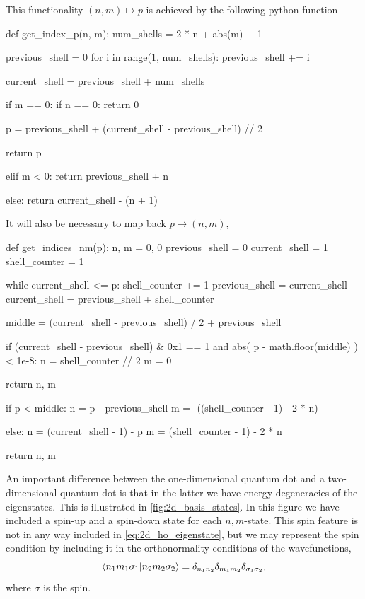 This functionality $(n,m)\mapsto p$ is 
achieved by the following python function
\begin{python}
def get_index_p(n, m):
    num_shells = 2 * n + abs(m) + 1

    previous_shell = 0
    for i in range(1, num_shells):
        previous_shell += i

    current_shell = previous_shell + num_shells

    if m == 0:
        if n == 0:
            return 0

        p = previous_shell + (current_shell - previous_shell) // 2

        return p

    elif m < 0:
        return previous_shell + n

    else:
        return current_shell - (n + 1)
\end{python}
It will also be necessary to map back $p\mapsto(n,m)$,
\begin{python}
def get_indices_nm(p):
    n, m = 0, 0
    previous_shell = 0
    current_shell = 1
    shell_counter = 1

    while current_shell <= p:
        shell_counter += 1
        previous_shell = current_shell
        current_shell = previous_shell + shell_counter

    middle = (current_shell - previous_shell) / 2 + previous_shell

    if (current_shell - previous_shell) & 0x1 == 1 and abs(
        p - math.floor(middle)
    ) < 1e-8:
        n = shell_counter // 2
        m = 0

        return n, m

    if p < middle:
        n = p - previous_shell
        m = -((shell_counter - 1) - 2 * n)

    else:
        n = (current_shell - 1) - p
        m = (shell_counter - 1) - 2 * n

    return n, m
\end{python}

An important difference between the one-dimensional quantum dot and a two-dimensional 
quantum dot is that in the latter we have energy degeneracies of the eigenstates.
This is illustrated in \autoref{fig:2d_basis_states}. In this figure we have included 
a spin-up and a spin-down state for each $n,m$-state. This spin feature is not in any way 
included in \autoref{eq:2d_ho_eigenstate}, but we may represent the spin condition by
including it in the orthonormality conditions of the wavefunctions,
\begin{equation}
    \braket{n_1m_1\sigma_1}{n_2m_2\sigma_2} 
    = \delta_{n_1n_2}\delta_{m_1m_2}\delta_{\sigma_1\sigma_2},
\end{equation}
where $\sigma$ is the spin.


